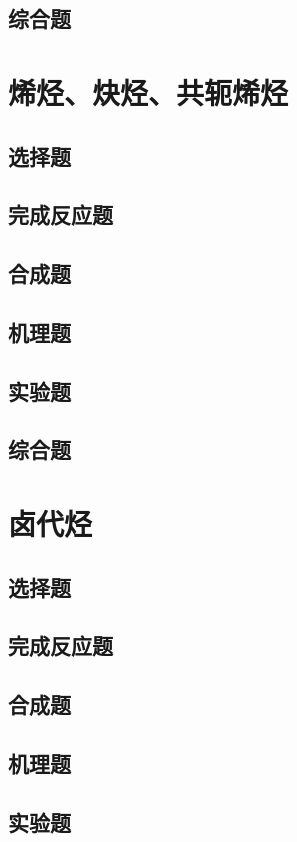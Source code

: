 \documentclass[
  10pt,
  twoside,
  openany,
  b5paper, %
  colorscheme = basic, %
]{qyxf-book}
\begin{document}
\section{综合题}

\chapter{烯烃、炔烃、共轭烯烃}

\section{选择题}
\section{完成反应题}
\section{合成题}
\section{机理题}
\section{实验题}
\section{综合题}

\chapter{卤代烃}

\section{选择题}
\section{完成反应题}
\section{合成题}
\section{机理题}
\section{实验题}
\end{document}
